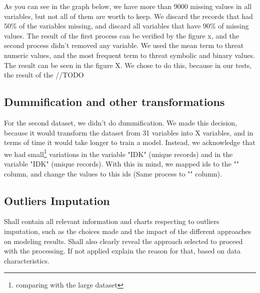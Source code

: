 \documentclass[11pt]{article}
\begin{document}
As you can see in the graph below, we have more than 9000 missing values in all variables, but not all of them are worth to keep. We discard the records that had $50\%$ of the variables missing, and discard all variables that have $90\%$ of missing values. The result of the first process can be verified by the figure x, and the second process didn't removed any variable. We used the mean term to threat numeric values, and the most frequent term to threat symbolic and binary values. The result can be seen in the figure X. We chose to do this, because in our tests, the result of the //TODO

\subsection*{Dummification and other transformations}

For the second dataset, we didn't do dummification. We made this decision, because it would transform the dataset from 31 variables into X variables, and in terms of time it would take longer to train a model. Instead, we acknowledge that we had small\footnote{\label{small_variation}comparing with the large dataset} variations in the variable "IDK" (unique records) and in the variable "IDK" (unique records). With this in mind, we mapped ids to the "" column, and change the values to this ids (Same process to "" column).


\subsection*{Outliers Imputation}
\begin{tcolorbox} %
Shall contain all relevant information and charts respecting to outliers imputation, such as the choices made and the impact of the different approaches on modeling results. Shall also clearly reveal the approach selected to proceed with the processing. 
If not applied explain the reason for that, based on data characteristics.
\end{tcolorbox} %
\end{document}
